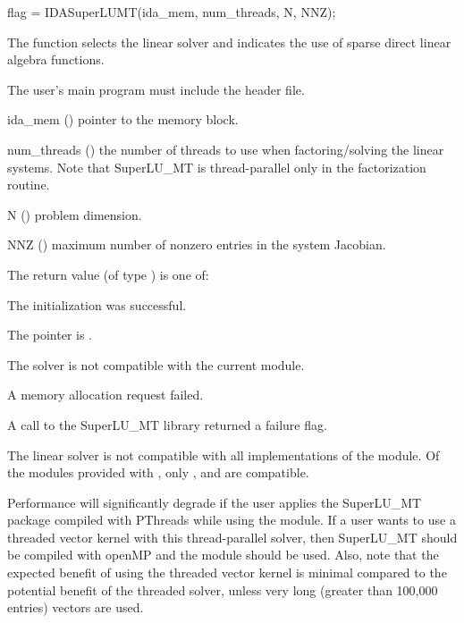 {
  flag = IDASuperLUMT(ida\_mem, num\_threads, N, NNZ);
}
{
  The function  selects the {\idasuperlumt} linear
  solver and indicates the use of sparse direct linear
  algebra functions.

  The user's main program must include the  header file.
}
{
  \begin{args}
  \item[ida\_mem] ()
    pointer to the {\ida} memory block.
  \item[num\_threads] ()
    the number of threads to use when factoring/solving the linear systems.
    Note that SuperLU\_MT is thread-parallel only in the factorization routine.
 \item[N] ()
    problem dimension.
  \item[NNZ] ()
    maximum number of nonzero entries in the system Jacobian.
  \end{args}
}
{
  The return value  (of type ) is one of:
  \begin{args}
  \item[\Id{IDASLS\_SUCCESS}] 
    The {\idasuperlumt} initialization was successful.
  \item[\Id{IDASLS\_MEM\_NULL}]
    The  pointer is .
  \item[\Id{IDASLS\_ILL\_INPUT}]
    The {\idasuperlumt} solver is not compatible with the current {\nvector} module.
  \item[\Id{IDASLS\_MEM\_FAIL}]
    A memory allocation request failed.
  \item[\Id{IDASLS\_PACKAGE\_FAIL}]
    A call to the SuperLU\_MT library returned a failure flag.
  \end{args}
}
{
  The {\idasuperlumt} linear solver is not compatible with all
  implementations of the {\nvector} module. 
  Of the {\nvector} modules provided with {\sundials}, only {\nvecs},
  {\nvecopenmp} and {\nvecpthreads} are compatible.

  {\warn}Performance will significantly degrade if the user applies the SuperLU\_MT
  package compiled with PThreads while using the {\nvecopenmp} module.
  If a user wants to use a threaded vector kernel with this thread-parallel
  solver, then SuperLU\_MT should be compiled with openMP and the {\nvecopenmp}
  module should be used.  Also, note that the expected benefit of using the threaded
  vector kernel is minimal compared to the potential benefit of the threaded solver,
  unless very long (greater than 100,000 entries) vectors are used.
}

